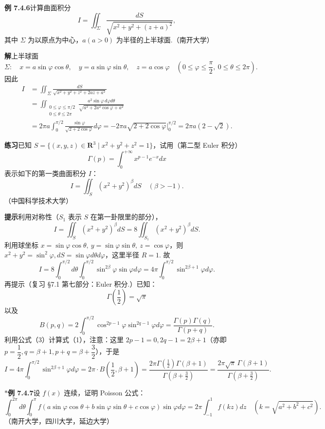 \documentclass[UTF8, 12pt, fontset=fandol, oneside]{ctexart}
\begin{document}
\noindent\textbf{例 7.4.6}\quad 计算曲面积分
\[
I=\iint_\Sigma\frac{dS}{\sqrt{x^2+y^2+(z+a)^2}},
\]
其中 $\Sigma$ 为以原点为中心，$a(a>0)$ 为半径的上半球面.（南开大学）

\noindent\textbf{解}\quad 上半球面
\[
\Sigma:\quad x=a\sin\varphi\cos\theta,\quad
y=a\sin\varphi\sin\theta,\quad z=a\cos\varphi
\quad\left(0\le\varphi\le\frac\pi2,\ 0\le\theta\le2\pi\right).
\]
因此
\[
\begin{aligned}
I&=\iint_\Sigma\frac{dS}{\sqrt{x^2+y^2+z^2+2az+a^2}}\\
&=\iint_{\substack{0\le\varphi\le\pi/2\\0\le\theta\le2\pi}}
\frac{a^2\sin\varphi\,d\varphi d\theta}{\sqrt{a^2+2a^2\cos\varphi+a^2}}\\
&=2\pi a\int_0^{\pi/2}\frac{\sin\varphi}{\sqrt{2+2\cos\varphi}}d\varphi
=-2\pi a\sqrt{2+2\cos\varphi}\bigg|_0^{\pi/2}
=2\pi a(2-\sqrt2).
\end{aligned}
\]

\noindent\textbf{练习}\quad 已知 $S=\{(x,y,z)\in\mathbf R^3\mid x^2+y^2+z^2=1\}$，试用（第二型 Euler 积分）
\[
\Gamma(p)=\int_0^{+\infty}x^{p-1}e^{-x}dx
\]
表示如下的第一类曲面积分 $I$：
\[
I=\iint_S(x^2+y^2)^\beta dS\quad(\beta>-1).
\]
（中国科学技术大学）

\noindent\textbf{提示}\quad 利用对称性（$S_1$ 表示 $S$ 在第一卦限里的部分），
\[
I=\iint_S(x^2+y^2)^\beta dS
=8\iint_{S_1}(x^2+y^2)^\beta dS.
\]
利用球坐标 $x=\sin\varphi\cos\theta,\ y=\sin\varphi\sin\theta,\ z=\cos\varphi$，则 $x^2+y^2=\sin^2\varphi,dS=\sin\varphi d\theta d\varphi$，这里半径 $R=1$. 故
\[
I=8\int_0^{\pi/2}d\theta\int_0^{\pi/2}\sin^{2\beta}\varphi\sin\varphi d\varphi
=4\pi\int_0^{\pi/2}\sin^{2\beta+1}\varphi d\varphi.
\tag{1}
\]
再提示（复习 §7.1 第七部分：Euler 积分.）已知：
\[
\Gamma\left(\frac12\right)=\sqrt\pi
\tag{2}
\]
以及
\[
B(p,q)=2\int_0^{\pi/2}\cos^{2p-1}\varphi\sin^{2q-1}\varphi d\varphi
=\frac{\Gamma(p)\Gamma(q)}{\Gamma(p+q)}.
\tag{3}
\]
利用公式（3）计算式（1），注意：这里 $2p-1=0,2q-1=2\beta+1$（亦即 $p=\dfrac12,q=\beta+1,p+q=\beta+\dfrac32$），于是
\[
I=4\pi\int_0^{\pi/2}\sin^{2\beta+1}\varphi d\varphi
=2\pi\cdot B\left(\frac12,\beta+1\right)
=\frac{2\pi\Gamma\left(\frac12\right)\Gamma(\beta+1)}
{\Gamma\left(\beta+\frac32\right)}
=\frac{2\pi\sqrt\pi\,\Gamma(\beta+1)}
{\Gamma\left(\beta+\frac32\right)}.
\]

\noindent\textbf{$*$例 7.4.7}\quad 设 $f(x)$ 连续，证明 Poisson 公式：
\[
\int_0^{2\pi}d\theta\int_0^\pi
f(a\sin\varphi\cos\theta+b\sin\varphi\sin\theta+c\cos\varphi)
\sin\varphi d\varphi
=2\pi\int_{-1}^1f(kz)dz
\quad\left(k=\sqrt{a^2+b^2+c^2}\right).
\tag{1}
\]
（南开大学，四川大学，延边大学）
\end{document}
